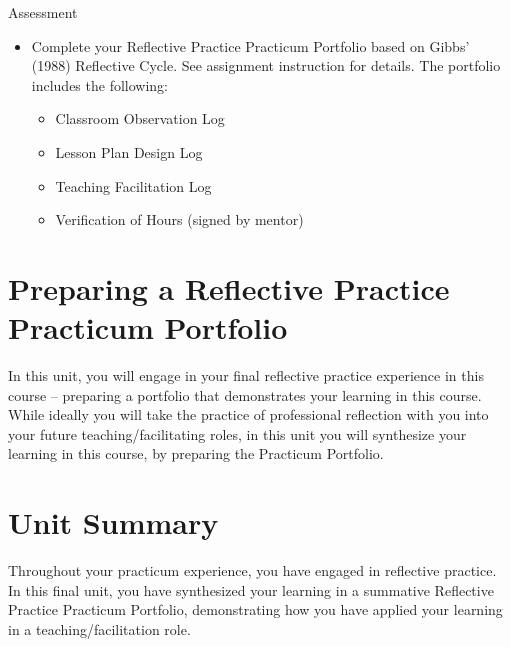 \documentclass[
]{book}
\providecommand{\tightlist}{%
  \setlength{\itemsep}{0pt}\setlength{\parskip}{0pt}}
\begin{document}
\begin{assessment}
{Assessment}

\begin{itemize}
\tightlist
\item
  Complete your Reflective Practice Practicum Portfolio based on Gibbs' (1988) Reflective Cycle. See assignment instruction for details. The portfolio includes the following:

  \begin{itemize}
  \tightlist
  \item
    Classroom Observation Log\\
  \item
    Lesson Plan Design Log\\
  \item
    Teaching Facilitation Log\\
  \item
    Verification of Hours (signed by mentor)
  \end{itemize}
\end{itemize}
\end{assessment}

\hypertarget{preparing-a-reflective-practice-practicum-portfolio}{%
\section{Preparing a Reflective Practice Practicum Portfolio}\label{preparing-a-reflective-practice-practicum-portfolio}}

In this unit, you will engage in your final reflective practice experience in this course -- preparing a portfolio that demonstrates your learning in this course. While ideally you will take the practice of professional reflection with you into your future teaching/facilitating roles, in this unit you will synthesize your learning in this course, by preparing the Practicum Portfolio.

\hypertarget{unit-summary-4}{%
\section*{Unit Summary}\label{unit-summary-4}}

Throughout your practicum experience, you have engaged in reflective practice. In this final unit, you have synthesized your learning in a summative Reflective Practice Practicum Portfolio, demonstrating how you have applied your learning in a teaching/facilitation role.
\end{document}
